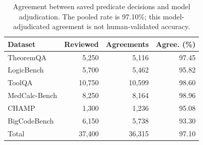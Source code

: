 \begin{table}[t]
\centering
\begin{minipage}{0.48\textwidth}
\centering
\small
\begin{tabular}{@{}lrrr@{}}
\toprule
Dataset & Reviewed & Agreements & Agree. (\%) \\
\midrule
TheoremQA & 5,250 & 5,116 & 97.45 \\
LogicBench & 5,700 & 5,462 & 95.82 \\
ToolQA & 10,750 & 10,599 & 98.60 \\
MedCalc-Bench & 8,250 & 8,164 & 98.96 \\
CHAMP & 1,300 & 1,236 & 95.08 \\
BigCodeBench & 6,150 & 5,738 & 93.30 \\
\midrule
Total & 37,400 & 36,315 & 97.10 \\
\bottomrule
\end{tabular}
\caption{Agreement between saved predicate decisions and model adjudication. The pooled rate is 97.10\%; this model-adjudicated agreement is not human-validated accuracy.}
\label{tab:app-evaluator-validation}
\end{minipage}
\end{table}
